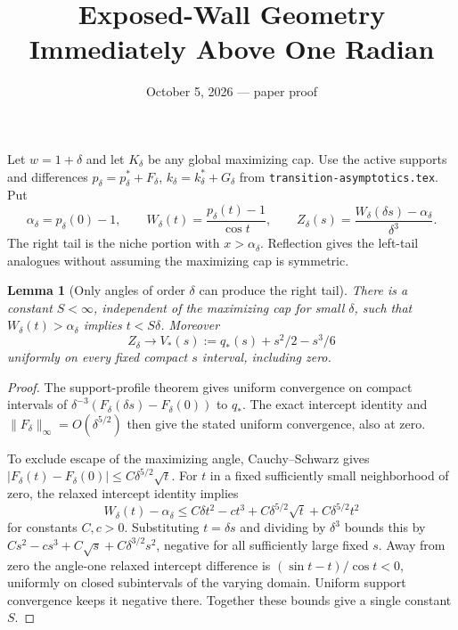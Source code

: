 \documentclass[11pt]{article}
\title{Exposed-Wall Geometry Immediately Above One Radian}
\author{}\date{October 5, 2026 --- paper proof}
\newtheorem{lemma}{Lemma}
\begin{document}
\maketitle
Let $w=1+\delta$ and let $K_\delta$ be any global maximizing cap. Use the active supports and differences $p_\delta=p_\delta^*+F_\delta$, $k_\delta=k_\delta^*+G_\delta$ from \texttt{transition-asymptotics.tex}. Put
\[
 \alpha_\delta=p_\delta(0)-1,\qquad
 W_\delta(t)=\frac{p_\delta(t)-1}{\cos t},\qquad
 Z_\delta(s)=\frac{W_\delta(\delta s)-\alpha_\delta}{\delta^3}.
\]
The right tail is the niche portion with $x>\alpha_\delta$. Reflection gives the left-tail analogues without assuming the maximizing cap is symmetric.

\begin{lemma}[Only angles of order $\delta$ can produce the right tail]
There is a constant $S<\infty$, independent of the maximizing cap for small $\delta$, such that $W_\delta(t)>\alpha_\delta$ implies $t<S\delta$. Moreover
\[
 Z_\delta\longrightarrow V_*(s):=q_*(s)+s^2/2-s^3/6
\]
uniformly on every fixed compact $s$ interval, including zero.
\end{lemma}
\begin{proof}
The support-profile theorem gives uniform convergence on compact intervals of $\delta^{-3}(F_\delta(\delta s)-F_\delta(0))$ to $q_*$. The exact intercept identity and $\|F_\delta\|_\infty=O(\delta^{5/2})$ then give the stated uniform convergence, also at zero.

To exclude escape of the maximizing angle, Cauchy--Schwarz gives
$|F_\delta(t)-F_\delta(0)|\le C\delta^{5/2}\sqrt t$. For $t$ in a fixed sufficiently small neighborhood of zero, the relaxed intercept identity implies
\[
 W_\delta(t)-\alpha_\delta
 \le C\delta t^2-c t^3+C\delta^{5/2}\sqrt t+C\delta^{5/2}t^2
\]
for constants $C,c>0$. Substituting $t=\delta s$ and dividing by $\delta^3$ bounds this by $Cs^2-cs^3+C\sqrt s+C\delta^{3/2}s^2$, negative for all sufficiently large fixed $s$. Away from zero the angle-one relaxed intercept difference is $(\sin t-t)/\cos t<0$, uniformly on closed subintervals of the varying domain. Uniform support convergence keeps it negative there. Together these bounds give a single constant $S$.
\end{proof}
\end{document}
